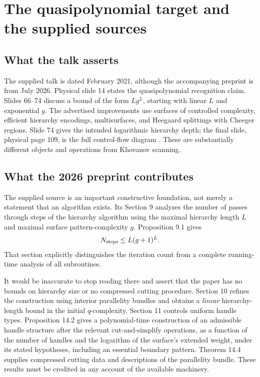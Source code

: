 \documentclass[11pt,a4paper]{article}
\theoremstyle{definition}\newtheorem{remark}[theorem]{Remark}
\begin{document}
\section{The quasipolynomial target and the supplied sources}
\label{sec:lackenby}
\subsection{What the talk asserts}
The supplied talk is dated February 2021, although the accompanying preprint is
from July 2026. Physical slide 14 states the quasipolynomial recognition claim.
Slides 66--74 discuss a bound of the form $Lg^L$, starting with linear $L$ and
exponential $g$. The advertised improvements use surfaces of controlled
complexity, efficient hierarchy encodings, multisurfaces, and Heegaard splittings
with Cheeger regions. Slide 74 gives the intended logarithmic hierarchy depth;
the final slide, physical page 109, is the full control-flow diagram
\cite{Ltalk}. These are substantially different objects and operations from
Khovanov scanning.

\subsection{What the 2026 preprint contributes}
The supplied source \cite{L2026} is an important constructive foundation, not
merely a statement that an algorithm exists. Its Section 9 analyzes the number
of passes through steps of the hierarchy algorithm using the maximal hierarchy
length $L$ and maximal surface pattern-complexity $g$. Proposition 9.1 gives
\begin{equation}
N_{\rm steps}\le L(g+1)^L.
\label{eq:hierarchy}
\end{equation}
That section explicitly distinguishes the iteration count from a complete
running-time analysis of all subroutines.

It would be inaccurate to stop reading there and assert that the paper has no
bounds on hierarchy size or no compressed cutting procedure. Section 10 refines
the construction using interior parallelity bundles and obtains a \emph{linear}
hierarchy-length bound in the initial $q$-complexity. Section 11 controls uniform
handle types. Proposition 14.2 gives a polynomial-time construction of an
admissible handle structure after the relevant cut-and-simplify operations, as a
function of the number of handles and the logarithm of the surface's extended
weight, under its stated hypotheses, including an essential boundary pattern.
Theorem 14.4 supplies compressed cutting data and descriptions of the parallelity
bundle. These results must be credited in any account of the available machinery.
\end{document}
